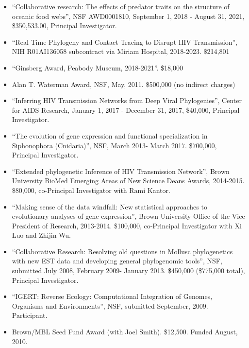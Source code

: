 \begin{itemize}

\item ``Collaborative research: The effects of predator traits on the structure of oceanic food webs'', NSF AWD0001810, September 1, 2018 - August 31, 2021, \$350,533.00, Principal Investigator.

\item ``Real Time Phylogeny and Contact Tracing to Disrupt HIV Transmission'', NIH R01AI136058 subcontract via Miriam Hospital, 2018-2023. \$214,801

\item ``Ginsberg Award, Peabody Museum, 2018-2021''. \$18,000

\item Alan T. Waterman Award, NSF, May, 2011. \$500,000 (no indirect charges)

\item ``Inferring HIV Transmission Networks from Deep Viral Phylogenies'', Center for AIDS Research, January 1, 2017 - December 31, 2017, \$40,000, Principal Investigator.

\item ``The evolution of gene expression and functional specialization in Siphonophora (Cnidaria)'', NSF, March 2013- March 2017. \$700,000, Principal Investigator.

\item ``Extended phylogenetic Inference of HIV Transmission Network'', Brown University BioMed Emerging Areas of New Science Deans Awards, 2014-2015. \$80,000, co-Principal Investigator with Rami Kantor.

\item ``Making sense of the data windfall: New statistical approaches to evolutionary analyses of gene expression'', Brown University Office of the Vice President of Research, 2013-2014. \$100,000, co-Principal Investigator with Xi Luo and Zhijin Wu.

\item ``Collaborative Research: Resolving old questions in Mollusc phylogenetics with new EST data and developing general phylogenomic tools'', NSF, submitted July 2008, February 2009- January 2013. \$450,000 (\$775,000 total), Principal Investigator.

\item ``IGERT:  Reverse Ecology: Computational Integration of Genomes, Organisms and Environments'', NSF, submitted September, 2009. Participant.

\item Brown/MBL Seed Fund Award (with Joel Smith). \$12,500. Funded August, 2010.


\end{itemize}
